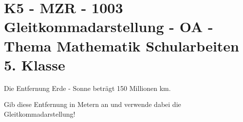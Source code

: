 \section{K5 - MZR - 1003 Gleitkommadarstellung - OA - Thema Mathematik Schularbeiten 5. Klasse}

\begin{beispiel}[K5 - MZR]{1} %
Die Entfernung Erde - Sonne beträgt 150 Millionen km.

Gib diese Entfernung in Metern an und verwende dabei die Gleitkommadarstellung!

				
\end{beispiel}